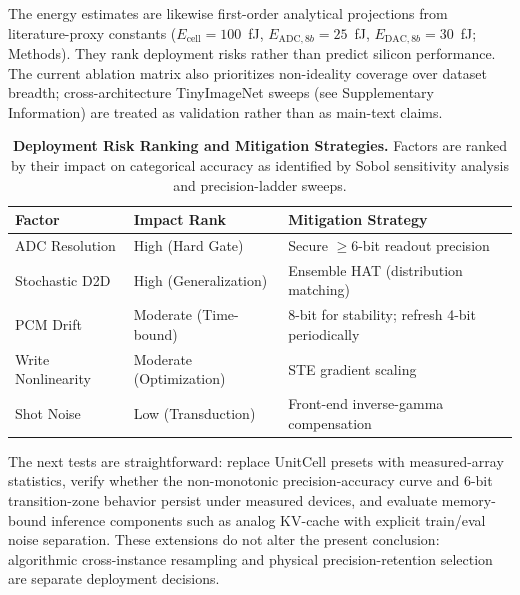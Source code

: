 The energy estimates are likewise first-order analytical projections from literature-proxy constants ($E_{\text{cell}}=100$~fJ, $E_{\text{ADC},8b}=25$~fJ, $E_{\text{DAC},8b}=30$~fJ; Methods). They rank deployment risks rather than predict silicon performance. The current ablation matrix also prioritizes non-ideality coverage over dataset breadth; cross-architecture TinyImageNet sweeps (see Supplementary Information) are treated as validation rather than as main-text claims.

\begin{table}[htbp]
\centering
\caption{\textbf{Deployment Risk Ranking and Mitigation Strategies.} Factors are ranked by their impact on categorical accuracy as identified by Sobol sensitivity analysis and precision-ladder sweeps.}
\label{tab:deployment_risks}
\begin{tabular}{lll}
\toprule
\textbf{Factor} & \textbf{Impact Rank} & \textbf{Mitigation Strategy} \\
\midrule
ADC Resolution & High (Hard Gate) & Secure $\geq$6-bit readout precision \\
Stochastic D2D & High (Generalization) & Ensemble HAT (distribution matching) \\
PCM Drift & Moderate (Time-bound) & 8-bit for stability; refresh 4-bit periodically \\
Write Nonlinearity & Moderate (Optimization) & STE gradient scaling \\
Shot Noise & Low (Transduction) & Front-end inverse-gamma compensation \\
\bottomrule
\end{tabular}
\end{table}

The next tests are straightforward: replace UnitCell presets with measured-array statistics, verify whether the non-monotonic precision-accuracy curve and 6-bit transition-zone behavior persist under measured devices, and evaluate memory-bound inference components such as analog KV-cache with explicit train/eval noise separation. These extensions do not alter the present conclusion: algorithmic cross-instance resampling and physical precision-retention selection are separate deployment decisions.
